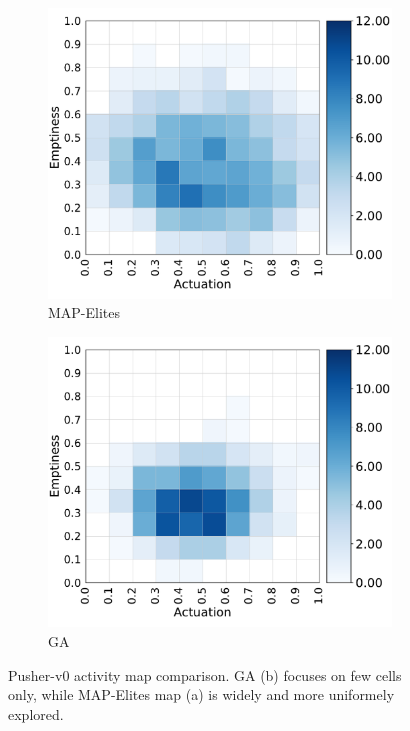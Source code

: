 \begin{figure}[H]
    \centering
    \begin{subfigure}[b]{0.49\textwidth}
         \centering
         \includegraphics[scale=0.45]{images/brain_opt/pusher/pusher_qd_ag}
         \caption{MAP-Elites}
    \end{subfigure}
    \hfill
    \begin{subfigure}[b]{0.49\textwidth}
         \centering
         \includegraphics[scale=0.45]{images/brain_opt/pusher/pusher_ga_ag}
         \caption{GA}
    \end{subfigure}
    \caption{Pusher-v0 activity map comparison. GA (b) focuses on few cells only, while MAP-Elites map (a) is widely and more uniformely explored.}
    \label{fig:qd_ga_pusher_ag}
\end{figure}

